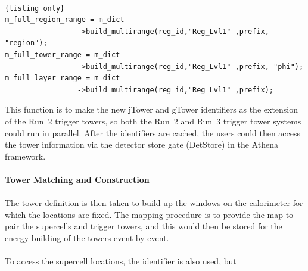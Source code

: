 \\
\begin{lstlisting}{listing only}
m_full_region_range = m_dict
                 ->build_multirange(reg_id,"Reg_Lvl1" ,prefix, "region");
m_full_tower_range = m_dict
                 ->build_multirange(reg_id,"Reg_Lvl1" ,prefix, "phi");
m_full_layer_range = m_dict
                 ->build_multirange(reg_id,"Reg_Lvl1" ,prefix);
\end{lstlisting}
\noindent
This function is to make the new jTower and gTower identifiers as the extension of the Run~2 trigger towers, so both the Run~2 and Run~3 trigger tower systems could run in parallel. After the identifiers are cached, the users could then access the tower information via the detector store gate (DetStore)\cite{Calafiura:2003gf} in the Athena framework. 
\\
\\{\bf Tower Matching and Construction }
\\
\\The tower definition is then taken to build up the windows on the calorimeter for which the locations are fixed. The mapping procedure is to provide the map to pair the supercells and trigger towers, and this would then be stored for the energy building of the towers event by event.
\\
\\To access the supercell locations, the identifier is also used, but  